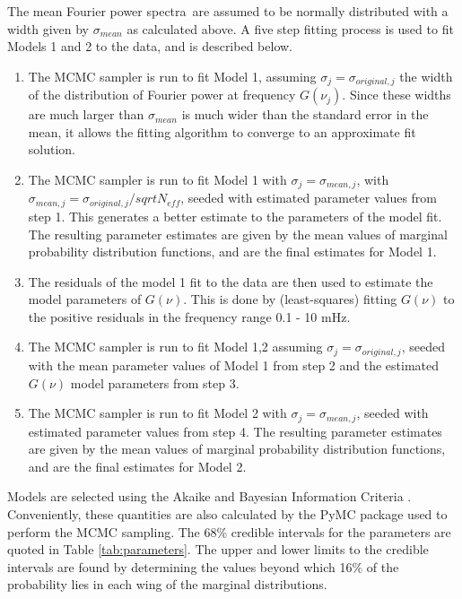 \documentclass[onecolumn]{emulateapj}
\newcommand{\PA}{power spectra}
\newcommand{\mFpa}{mean Fourier \PA}
\begin{document}
The \mFpa\ are assumed to be normally distributed with a width given
by $\sigma_{mean}$ as calculated above.  A five step fitting process is
used to fit Models 1 and 2 to the data, and is described below.

\begin{enumerate}
\item The MCMC sampler is run to fit Model 1, assuming $\sigma_{j} =
  \sigma_{original, j}$ the width of the distribution of Fourier power
  at frequency $G(\nu_{j})$.  Since these widths are much larger than
  $\sigma_{mean}$ is much wider than the standard error in the mean,
  it allows the fitting algorithm to converge to an approximate fit
  solution.
\item The MCMC sampler is run to fit Model 1 with $\sigma_{j} =
  \sigma_{mean, j}$, with $\sigma_{mean, j}= \sigma_{original,
    j}/sqrt{N_{eff}}$, seeded with estimated parameter values from
  step 1.  This generates a better estimate to the parameters of the
  model fit.  The resulting parameter estimates are given by the mean
  values of marginal probability distribution functions, and are the
  final estimates for Model 1.
\item The residuals of the model 1 fit to the data are then used to
  estimate the model parameters of $G(\nu)$.  This is done by
  (least-squares) fitting $G(\nu)$ to the positive residuals in the
  frequency range 0.1 - 10 mHz.
\item The MCMC sampler is run to fit Model 1,2 assuming $\sigma_{j} =
  \sigma_{original, j}$, seeded with the mean parameter values of
  Model 1 from step 2 and the estimated $G(\nu)$ model parameters from
  step 3.
\item The MCMC sampler is run to fit Model 2 with $\sigma_{j} =
  \sigma_{mean, j}$, seeded with estimated parameter values from step
  4.  The resulting parameter estimates are given by the mean values
  of marginal probability distribution functions, and are the final
  estimates for Model 2.
\end{enumerate}
Models are selected using the Akaike and Bayesian Information Criteria
\citep{2007MNRAS.377L..74L}.  Conveniently, these quantities are also
calculated by the PyMC package used to perform the MCMC sampling.  The
68\% credible intervals for the parameters are quoted in Table
\ref{tab:parameters}.  The upper and lower limits to the credible
intervals are found by determining the values beyond which 16\% of the
probability lies in each wing of the marginal distributions.
\end{document}
